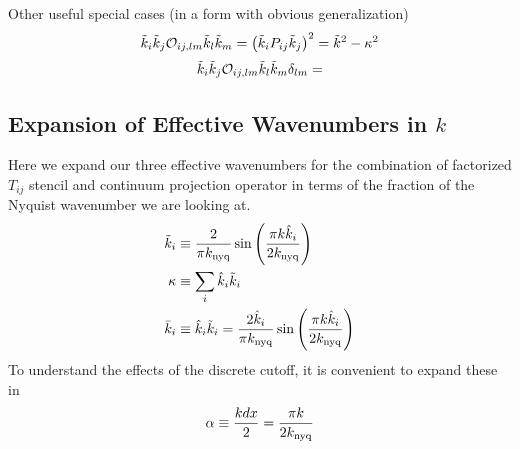 \documentclass{revtex4}
\begin{document}
Other useful special cases (in a form with obvious generalization)
\begin{equation}
  \tilde{k}_i\tilde{k}_j\mathcal{O}_{ij,lm}\tilde{k}_l\tilde{k}_m = \left(\tilde{k}_iP_{ij}\tilde{k}_j\right)^2 = \tilde{k}^2-\kappa^2
\end{equation}
\begin{equation}
  \tilde{k}_i\tilde{k}_j\mathcal{O}_{ij,lm}\tilde{k}_l\tilde{k}_m\delta_{lm} = 
\end{equation}

\subsection{Expansion of Effective Wavenumbers in $k$}
Here we expand our three effective wavenumbers for the combination of factorized $T_{ij}$ stencil and continuum projection operator in terms of the fraction of the Nyquist wavenumber we are looking at.
\begin{subequations}
  \begin{align}
    \tilde{k}_i &\equiv \frac{2}{\pi k_{\rm nyq}}\sin\left(\frac{\pi k\hat{k}_i}{2k_{\rm nyq}}\right) \\
    \kappa &\equiv \sum_i \hat{k}_i\tilde{k}_i \\
    \bar{k}_i &\equiv \hat{k}_i\tilde{k}_i = \frac{2\hat{k}_i}{\pi k_{\rm nyq}}\sin\left(\frac{\pi k\hat{k}_i}{2k_{\rm nyq}}\right)
  \end{align}
\end{subequations}
To understand the effects of the discrete cutoff, it is convenient to expand these in
\begin{equation}
  \alpha \equiv \frac{kdx}{2} = \frac{\pi k}{2k_{\rm nyq}}
\end{equation}
\end{document}
